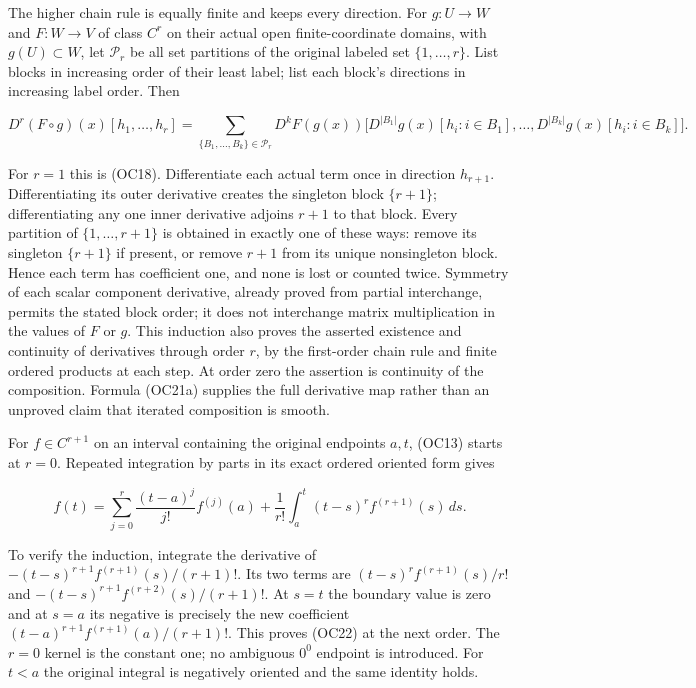 \documentclass[
  11pt,
]{article}
\begin{document}
The higher chain rule is equally finite and keeps every direction. For
\(g:U\to W\) and \(F:W\to V\) of class \(C^r\) on their actual open
finite-coordinate domains, with \(g(U)\subset W\), let \(\mathcal P_r\)
be all set partitions of the original labeled set \(\{1,\ldots,r\}\).
List blocks in increasing order of their least label; list each block's
directions in increasing label order. Then

\[
 D^r(F\circ g)(x)[h_1,\ldots,h_r]
 =\sum_{\{B_1,\ldots,B_k\}\in\mathcal P_r}
  D^kF(g(x))
   \bigl[D^{|B_1|}g(x)[h_i:i\in B_1],\ldots,
         D^{|B_k|}g(x)[h_i:i\in B_k]\bigr].
\tag{OC21a}
\]

For \(r=1\) this is (OC18). Differentiate each actual term once in
direction \(h_{r+1}\). Differentiating its outer derivative creates the
singleton block \(\{r+1\}\); differentiating any one inner derivative
adjoins \(r+1\) to that block. Every partition of \(\{1,\ldots,r+1\}\)
is obtained in exactly one of these ways: remove its singleton
\(\{r+1\}\) if present, or remove \(r+1\) from its unique nonsingleton
block. Hence each term has coefficient one, and none is lost or counted
twice. Symmetry of each scalar component derivative, already proved from
partial interchange, permits the stated block order; it does not
interchange matrix multiplication in the values of \(F\) or \(g\). This
induction also proves the asserted existence and continuity of
derivatives through order \(r\), by the first-order chain rule and
finite ordered products at each step. At order zero the assertion is
continuity of the composition. Formula (OC21a) supplies the full
derivative map rather than an unproved claim that iterated composition
is smooth.

For \(f\in C^{r+1}\) on an interval containing the original endpoints
\(a,t\), (OC13) starts at \(r=0\). Repeated integration by parts in its
exact ordered oriented form gives

\[
 f(t)=\sum_{j=0}^r\frac{(t-a)^j}{j!}f^{(j)}(a)
   +\frac1{r!}\int_a^t(t-s)^r f^{(r+1)}(s)\,ds.
\tag{OC22}
\]

To verify the induction, integrate the derivative of
\(-(t-s)^{r+1}f^{(r+1)}(s)/(r+1)!\). Its two terms are
\((t-s)^r f^{(r+1)}(s)/r!\) and \(-(t-s)^{r+1}f^{(r+2)}(s)/(r+1)!\). At
\(s=t\) the boundary value is zero and at \(s=a\) its negative is
precisely the new coefficient \((t-a)^{r+1}f^{(r+1)}(a)/(r+1)!\). This
proves (OC22) at the next order. The \(r=0\) kernel is the constant one;
no ambiguous \(0^0\) endpoint is introduced. For \(t<a\) the original
integral is negatively oriented and the same identity holds.
\end{document}
